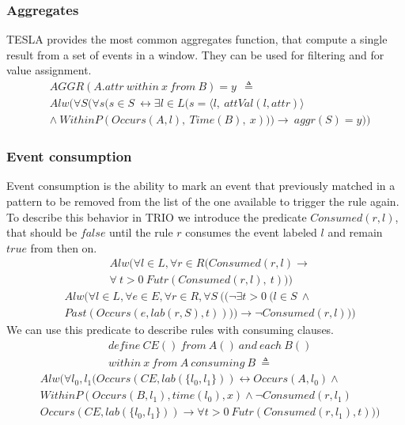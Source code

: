 \subsubsection{Aggregates}
TESLA provides the most common aggregates function, that compute a single result from a set of events in a window. They can be used for filtering and for value assignment.
\begin{align*}
&AGGR(A.attr\ within\ x\ from\ B) = y\ \ \triangleq\\
&Alw(\forall S (\forall s (s \in S\ \leftrightarrow \exists l \in
L (s = \langle l,\ attVal(l,attr) \rangle\\
&\wedge\ WithinP(Occurs(A,l),\ Time(B),\ x))) \rightarrow\ aggr(S)=y))
\end{align*}

\subsubsection{Event consumption}
Event consumption is the ability to mark an event that previously matched in a pattern to be removed from the list of the one available to trigger the rule again. To describe this behavior in TRIO we introduce the predicate $Consumed(r, l)$, that should be $false$ until the rule $r$ consumes the event labeled $l$ and remain $true$ from then on.
\begin{align*}
&Alw(\forall l \in L, \forall r \in R (Consumed(r, l) \rightarrow\\
&\forall\ t > 0\ Futr(Consumed(r, l),\ t)))
\end{align*}
\begin{align*}
&Alw(\forall l \in L, \forall e \in E, \forall r \in R, \forall S\ ((\neg \exists t > 0\ (l \in S\ \wedge\\
&Past(Occurs(e, lab(r, S),t)))) \rightarrow \neg Consumed(r, l)))
\end{align*}
We can use this predicate to describe rules with consuming clauses.
\begin{align*}
&define\ CE()\ from\ A()\ and\ each\ B()\\
&within\ x\ from\ A\ consuming\ B\ \triangleq
\end{align*}
\begin{align*}
&Alw(\forall l_0, l_1 (Occurs(CE, lab(\{l_0, l_1\})) \leftrightarrow Occurs(A, l_0) \wedge\\
&WithinP(Occurs(B, l_1), time(l_0), x) \wedge \neg Consumed(r, l_1)\\
&Occurs(CE, lab(\{l_0, l_1\})) \rightarrow \forall t > 0\ Futr(Consumed(r, l_1), t)))
\end{align*}

